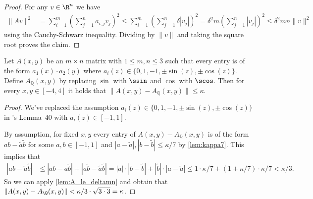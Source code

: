 \begin{proof}
\leanok
    For any $v\in \R^n$ we have
    \begin{align*}
        \|Av\|^2 &=\sum_{i=1}^m \left(\sum_{j=1}^na_{i,j}v_j\right)^2 \leq \sum_{i=1}^m\left(\sum_{j=1}^n \delta |v_j|\right)^2 = \delta^2 m\left(\sum_{j=1}^n |v_j|\right)^2 \leq \delta^2 m n \|v\|^2
    \end{align*}
    using the Cauchy-Schwarz inequality. Dividing by $\|v\|$ and taking the square root proves the claim.
\end{proof}

\begin{lemma}\label{lem:dist_le_kappa}
\leanok
{}
    Let $A(x,y)$ be an $m\times n$ matrix with $1 \leq m,n\leq 3$ such that every entry is of the form $a_1(x)\cdot a_2(y)$ where
    $a_i(z)\in \{0,1,-1,\pm\sin(z),\pm\cos(z)\}.$
    Define $A_{\mathbb{Q}}(x,y)$ by replacing $\sin$ with $\ssin$ and $\cos$ with $\scos$. Then for every $x,y\in[-4,4]$ it holds that
    $\|A(x,y)-A_{\mathbb{Q}}(x,y)\|\leq\kappa$.
\end{lemma}

\begin{proof}
\leanok
{}
    We've replaced the assumption $a_i(z)\in \{0,1,-1,\pm\sin(z),\pm\cos(z)\}$ in \cite{polyhedron.without.rupert}'s
    Lemma~40 with $a_i(z)\in [-1,1]$.

    By assumption, for fixed $x,y$ every entry of $A(x,y)-A_{\mathbb{Q}}(x,y)$ is of the form
    $a b - \widetilde{a}\widetilde{b}$ for some $a,b\in[-1,1]$ and $|a-\widetilde{a}|,|b-\widetilde{b}|\leq \kappa/7$ by \cref{lem:kappa7}. This implies that
    \begin{align*}
      |ab-\widetilde{a}\widetilde{b}|&\leq |a b-a\widetilde{b}|+|a \widetilde{b}-\widetilde{a}\widetilde{b}|
      =|a|\cdot |b-\widetilde{b}|+|\widetilde{b}|\cdot |a-\widetilde{a}| \leq 1\cdot \kappa/7+(1+\kappa/7) \cdot \kappa/7 <\kappa/3.
    \end{align*}
    So we can apply \cref{lem:A_le_deltamn} and obtain that $\|A(x,y)-A_{\Q}(x,y)\|<\kappa/3\cdot \sqrt{3\cdot 3}=\kappa$.
\end{proof}


